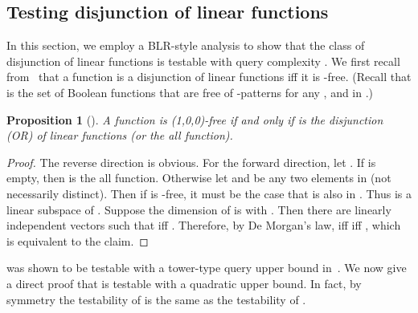\documentclass[11pt,english]{article}
\newtheorem{prop}{Proposition}
\theoremstyle{definition}
\theoremstyle{remark}
\begin{document}
\subsection{Testing disjunction of linear functions}
\label{Sec:100-free} 
In this section, we employ a BLR-style analysis to show that the class 
of disjunction of linear functions is testable with query complexity .
We first recall from~\cite{BCSX09} that a function is a disjunction of linear functions 
iff it is -free. (Recall that  is the set of Boolean functions
that are free of -patterns for any ,  and  in
.)

\begin{prop}[\cite{BCSX09}]\label{prop:char} 
A function  is (1,0,0)-free if and only if  is
the disjunction (OR) of linear functions (or the all  function).
\end{prop} 
\begin{proof} 
The reverse direction is obvious. 
For the forward direction, let . 
If  is empty, then  is the all  function. 
Otherwise let  and  be any two elements in  (not necessarily distinct). 
Then if  is -free, it must be the case that  is also in
. Thus  is a linear subspace of . 
Suppose the dimension of  is  with . 
Then there are  linearly independent vectors  such that  
iff .
Therefore, by De Morgan's law,  
iff  iff ,
which is equivalent to the claim. \end{proof}

 was shown to be testable with a tower-type query
upper bound in~\cite{BCSX09}. 
We now give a direct proof that  is testable with a quadratic upper bound. 
In fact, by symmetry the testability of  is the same as the testability of . 
\end{document}
